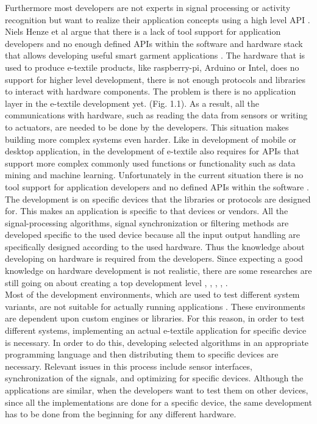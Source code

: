 	Furthermore most developers are not experts in signal processing or activity recognition but want to realize their application concepts using a high level API \cite{2}. Niels Henze et al argue that there is a lack of tool support for application developers and no enough defined APIs within the software and hardware stack that allows developing useful smart garment applications \cite{2}. The hardware that is used to produce e-textile products, like raspberry-pi, Arduino or Intel, does no support for higher level development, there is not enough protocols and libraries to interact with hardware components. The problem is there is no application layer in the e-textile development yet. (Fig. 1.1). As a result, all the communications with hardware, such as reading the data from sensors or writing to actuators, are needed to be done by the developers. This situation makes building more complex systems even harder. Like in development of mobile or desktop application, in the development of e-textile also requires for APIs that support more complex commonly used functions or functionality such as data mining and machine learning. Unfortunately in the current situation there is no tool support for application developers and no defined APIs within the software \cite{2}. The development is on specific devices that the libraries or protocols are designed for. This makes an application is specific to that devices or vendors. All the signal-processing algorithms, signal synchronization or filtering methods are developed specific to the used device because all the input output handling are specifically designed according to the used hardware. Thus the knowledge about developing on hardware is required from the developers. Since expecting a good knowledge on hardware development is not realistic, there are some researches are still going on about creating a top development level \cite{2}, \cite{4}, \cite{5}, \cite{8}, \cite{9}. \\

	Most of the development environments, which are used to test different system variants, are not suitable for actually running applications \cite{8}. These environments are dependent upon custom engines or libraries. For this reason, in order to test different systems, implementing an actual e-textile application for specific device is necessary. In order to do this, developing selected algorithms in an appropriate programming language and then distributing them to specific devices are necessary. Relevant issues in this process include sensor interfaces, synchronization of the signals, and optimizing for specific devices. Although the applications are similar, when the developers want to test them on other devices, since all the implementations are done for a specific device, the same development has to be done from the beginning for any different hardware.  \\
	


